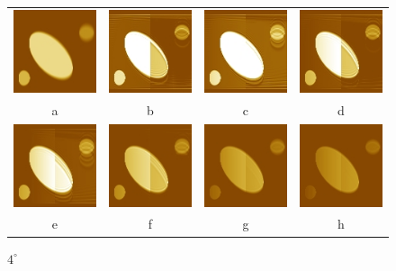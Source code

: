 \documentclass{procDDs}
\begin{document}
\begin{figure}[h!]\center%
	\begin{tabular}{cccc}
		\includegraphics[width=0.2\linewidth]{img/7/1.jpg}&
		\includegraphics[width=0.2\linewidth]{img/7/3.jpg}&
		\includegraphics[width=0.2\linewidth]{img/7/4.jpg}&
		\includegraphics[width=0.2\linewidth]{img/7/5.jpg}\\
		a & b & c & d\\
		\includegraphics[width=0.2\linewidth]{img/7/6.jpg}&
		\includegraphics[width=0.2\linewidth]{img/7/7.jpg}&
		\includegraphics[width=0.2\linewidth]{img/7/8.jpg}&
		\includegraphics[width=0.2\linewidth]{img/7/9.jpg}\\
		e & f & g & h
	\end{tabular}
	\caption{$4^\circ$}
	\label{ris:desc3}
\end{figure}
\end{document}
